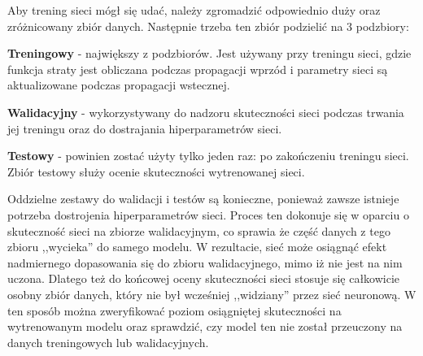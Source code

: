 Aby trening sieci mógł się udać, należy zgromadzić odpowiednio duży oraz zróżnicowany zbiór danych. Następnie trzeba ten zbiór podzielić na 3 podzbiory:
\begin{enumerate*}
\item \textbf{Treningowy} - największy z podzbiorów. Jest używany przy treningu sieci, gdzie funkcja straty jest obliczana podczas propagacji wprzód i parametry sieci są aktualizowane podczas propagacji wstecznej.
\item \textbf{Walidacyjny} - wykorzystywany do nadzoru skuteczności sieci podczas trwania jej treningu oraz do dostrajania hiperparametrów sieci.
\item \textbf{Testowy} - powinien zostać użyty tylko jeden raz: po zakończeniu treningu sieci. Zbiór testowy służy ocenie skuteczności wytrenowanej sieci.
\end{enumerate*}

Oddzielne zestawy do walidacji i testów są konieczne, ponieważ zawsze istnieje potrzeba dostrojenia hiperparametrów sieci. Proces ten dokonuje się w oparciu o skuteczność sieci na zbiorze walidacyjnym, co sprawia że część danych z tego zbioru ,,wycieka'' do samego modelu. W rezultacie, sieć może osiągnąć efekt nadmiernego dopasowania się \cite{goyal:overfittingGuide} do zbioru walidacyjnego, mimo iż nie jest na nim uczona. Dlatego też do końcowej oceny skuteczności sieci stosuje się całkowicie osobny zbiór danych, który nie był wcześniej ,,widziany'' przez sieć neuronową. W ten sposób można zweryfikować poziom osiągniętej skuteczności na wytrenowanym modelu oraz sprawdzić, czy model ten nie został przeuczony na danych treningowych lub walidacyjnych.


